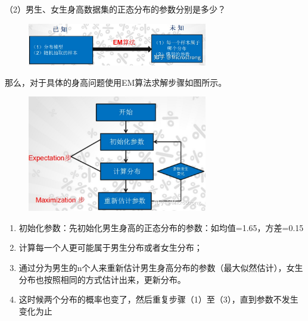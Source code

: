\documentclass[11pt,a4paper,oneside]{book}
\begin{document}
（2）男生、女生身高数据集的正态分布的参数分别是多少？
\begin{figure}[H]
	\centering
	\includegraphics[width=0.7\textwidth]{16.jpg}
\end{figure}
那么，对于具体的身高问题使用EM算法求解步骤如图所示。
\begin{figure}[H]
	\centering
	\includegraphics[width=0.7\textwidth]{17.jpg}
\end{figure}
\begin{enumerate}
	\item 初始化参数：先初始化男生身高的正态分布的参数：如均值=1.65，方差=0.15
	\item 计算每一个人更可能属于男生分布或者女生分布；
	\item 通过分为男生的n个人来重新估计男生身高分布的参数（最大似然估计），女生分布也按照相同的方式估计出来，更新分布。
	\item 这时候两个分布的概率也变了，然后重复步骤（1）至（3），直到参数不发生变化为止
\end{enumerate}
\end{document}
